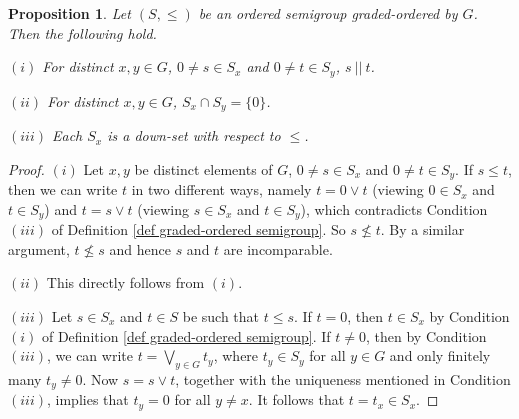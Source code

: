 \documentclass[a4paper,reqno,11pt]{amsart}
\numberwithin{equation}{section}
\newtheorem{prop}[thm]{Proposition}
\theoremstyle{definition}
\theoremstyle{remark}
\begin{document}
\begin{prop}\label{lem basics of graded core of S_Lambda}
Let $(S,\leqslant)$ be an ordered semigroup graded-ordered by $G$. Then the following hold.

$(i)$ For distinct $x,y\in G$, $0\neq s\in S_x$ and $0\neq t\in S_y$, $s~||~t$. 

$(ii)$ For distinct $x,y\in G$, $S_x\cap S_y=\{0\}$.

$(iii)$ Each $S_x$ is a down-set with respect to $\leqslant$.
\end{prop}
\begin{proof}
$(i)$ Let $x,y$ be distinct elements of $G$, $0\neq s\in S_x$ and $0\neq t\in S_y$. If $s\le t$, then we can write $t$ in two different ways, namely $t=0\vee t$ (viewing $0\in S_x$ and $t\in S_y$) and $t=s\vee t$ (viewing $s\in S_x$ and $t\in S_y$), which contradicts Condition $(iii)$ of Definition \ref{def graded-ordered semigroup}. So $s\nleq t$. By a similar argument, $t\nleq s$ and hence $s$ and $t$ are incomparable.

$(ii)$ This directly follows from $(i)$.

$(iii)$ Let $s\in S_x$ and $t\in S$ be such that $t\le s$. If $t=0$, then $t\in S_x$ by Condition $(i)$ of Definition \ref{def graded-ordered semigroup}. If $t\neq 0$, then by Condition $(iii)$, we can write $t=\displaystyle{\bigvee_{y\in G}}t_y$, where $t_y\in S_y$ for all $y\in G$ and only finitely many $t_y\neq 0$. Now $s=s\vee t$, together with the uniqueness mentioned in Condition $(iii)$, implies that $t_y=0$ for all $y\neq x$. It follows that $t=t_x\in S_x$. 
\end{proof}
\end{document}

